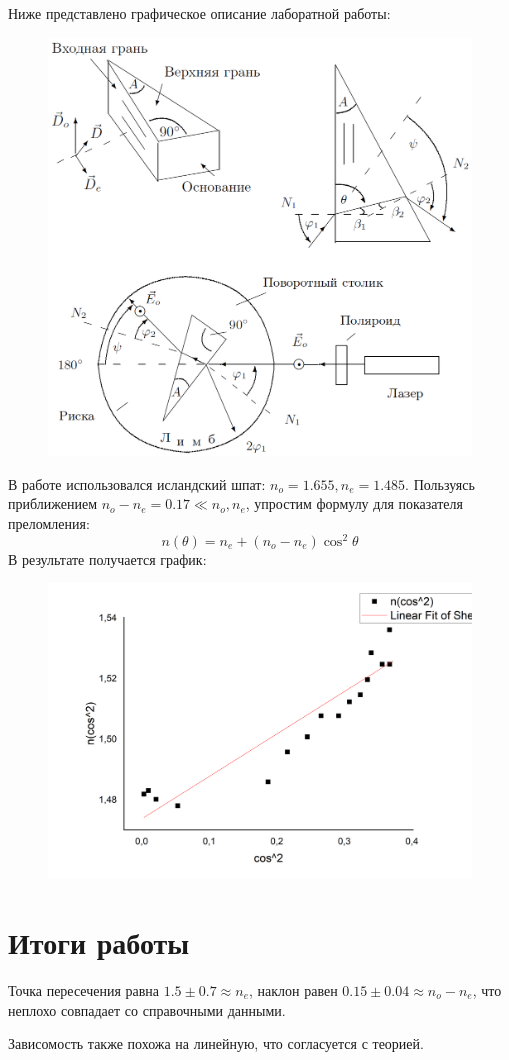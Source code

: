 \documentclass[a4paper,12pt]{article}
\begin{document}
Ниже представлено графическое описание лаборатной работы:	
\begin{figure}[h!]
	\begin{center}
		\includegraphics[scale = 0.7]{2.png}
	\end{center}
\end{figure}
 \newpage
 В работе использовался исландский шпат: $n_o = 1.655, n_e = 1.485$. Пользуясь приближением ${n_o} - {n_e} = 0.17 \ll {n_o},{n_e}$, упростим формулу для показателя преломления:
 \[n(\theta ) = {n_e} + ({n_o} - {n_e}){\cos ^2}\theta \]
 В результате получается график: 
 \begin{figure}[h!]
 	\begin{center}
 		\includegraphics[scale = 0.4]{3.png}
 	\end{center}
 \end{figure}

\section{Итоги работы}

Точка пересечения равна $1.5 \pm 0.7 \approx n_e$, наклон равен $0.15 \pm 0.04 \approx n_o-n_e$, что неплохо совпадает со справочными данными.

Зависомость также похожа на линейную, что согласуется с теорией.
  
\end{document}
